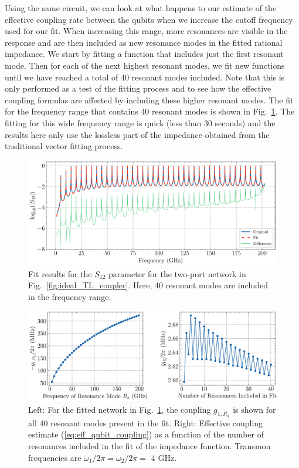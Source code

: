 Using the same circuit, we can look at what happens to our estimate of the effective coupling rate between the qubits when we increase the cutoff frequency used for our fit. When increasing this range, more resonances are visible in the response and are then included as new resonance modes in the fitted rational impedance. We start by fitting a function that includes just the first resonant mode. Then for each of the next highest resonant modes, we fit new functions until we have reached a total of 40 resonant modes included. Note that this is only performed as a test of the fitting process and to see how the effective coupling formulas are affected by including these higher resonant modes. The fit for the frequency range that contains 40 resonant modes is shown in Fig.\ \ref{fig:ideal_TL_coupler_fit_40_res}. The fitting for this wide frequency range is quick (less than 30 seconds) and the results here only use the lossless part of the impedance obtained from the traditional vector fitting process.

\begin{figure}[!h]
    \centering
    \includegraphics[width=\textwidth]{figures/ideal_TL_fit_40_res.pdf}
    \caption{Fit results for the $S_{12}$ parameter for the two-port network in Fig.\ \ref{fig:ideal_TL_coupler}. Here, 40 resonant modes are included in the frequency range.}
    \label{fig:ideal_TL_coupler_fit_40_res}
\end{figure}

\begin{figure}[!h]
    \centering
    \includegraphics[width=\textwidth]{figures/ideal_TL_coupling_change.pdf}
    \caption{Left: For the fitted network in Fig.\ \ref{fig:ideal_TL_coupler_fit_40_res}, the coupling $g_{1,R_k}$ is shown for all 40 resonant modes present in the fit. Right: Effective coupling estimate (\ref{eq:eff_qubit_coupling}) as a function of the number of resonances included in the fit of the impedance function. Transmon frequencies are $\omega_1/2\pi=\omega_2/2\pi = $ 4 GHz.}
    \label{fig:ideal_TL_geff_change}
\end{figure}

